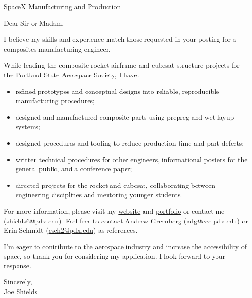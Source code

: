 \documentclass[letterpaper]{letter}
\begin{document}
\large

\begin{letter}{SpaceX Manufacturing and Production}
\opening{Dear Sir or Madam,}

I believe my skills and experience match those requested in your posting for a composites manufacturing engineer. 

While leading the composite rocket airframe and cubesat structure projects for the Portland State Aerospace Society, I have: 
\begin{itemize}
	\item refined prototypes and conceptual designs into reliable, reproducible manufacturing procedures;
	\item designed and manufactured composite parts using prepreg and wet-layup systems;
	\item designed procedures and tooling to reduce production time and part defects;
	\item written technical procedures for other engineers, informational posters for the general public, and a \href{http://arc.aiaa.org/doi/pdf/10.2514/6.2016-5365}{conference paper};
	\item directed projects for the rocket and cubesat, collaborating between engineering disciplines and mentoring younger students.
\end{itemize}
For more information, please visit my \href{http://joedang.github.io}{website} and \href{http://github.com/Joedang/Portfolio}{portfolio} or contact me (\href{mailto:shields6@pdx.edu}{shields6@pdx.edu}).
Feel free to contact Andrew Greenberg (\href{mailto:adg@ece.pdx.edu}{adg@ece.pdx.edu}) or Erin Schmidt (\href{mailto:esch2@pdx.edu}{esch2@pdx.edu}) as references. 

I'm eager to contribute to the aerospace industry and increase the accessibility of space, so thank you for considering my application. I look forward to your response. 

\closing{Sincerely,\\ Joe Shields}
\end{letter}
\end{document}
